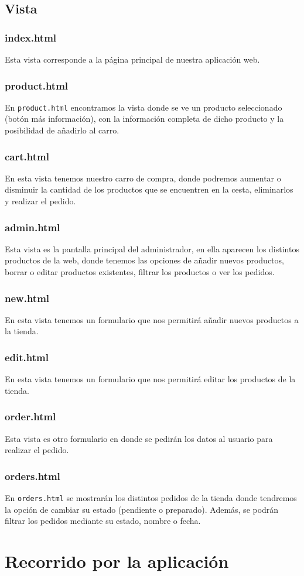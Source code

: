 \documentclass[12pt,a4paper,svgnames]{article}
\begin{document}
\subsection{Vista}
\subsubsection{index.html}
Esta vista corresponde a la página principal de nuestra aplicación web.
\subsubsection{product.html}
En \texttt{product.html} encontramos la vista donde se ve un producto seleccionado (botón más información), con la información completa de dicho producto y la posibilidad de añadirlo al carro.
\subsubsection{cart.html}
En esta vista tenemos nuestro carro de compra, donde podremos aumentar o disminuir la cantidad de los productos que se encuentren en la cesta, eliminarlos y realizar el pedido.
\subsubsection{admin.html}
Esta vista es la pantalla principal del administrador, en ella aparecen los distintos productos de la web, donde tenemos las opciones de añadir nuevos productos, borrar o editar productos existentes, filtrar los productos o ver los pedidos.
\subsubsection{new.html}
En esta vista tenemos un formulario que nos permitirá añadir nuevos productos a la tienda.
\subsubsection{edit.html}
En esta vista tenemos un formulario que nos permitirá editar los productos de la tienda.
\subsubsection{order.html}
Esta vista es otro formulario en donde se pedirán los datos al usuario para realizar el pedido.
\subsubsection{orders.html}
En \texttt{orders.html} se mostrarán los distintos pedidos de la tienda donde tendremos la opción de cambiar su estado (pendiente o preparado). Además, se podrán filtrar los pedidos mediante su estado, nombre o fecha.

\clearpage

\section{Recorrido por la aplicación}
\end{document}
